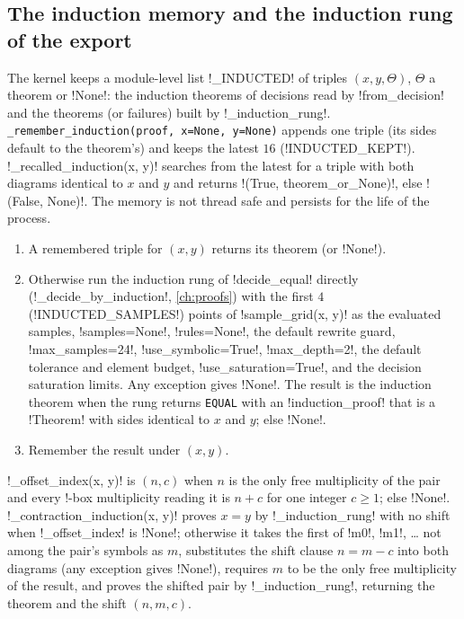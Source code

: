 \subsection{The induction memory and the induction rung of the export}\label{sec:kernel-memory}

The kernel keeps a module-level list \py!_INDUCTED! of triples $(x, y, \Theta)$, $\Theta$ a theorem or \py!None!: the induction theorems of decisions read by \py!from_decision! and the theorems (or failures) built by \py!_induction_rung!. \texttt{\_\allowbreak{}remember\_\allowbreak{}induction(\allowbreak{}proof,\allowbreak{} x=None,\allowbreak{} y=None)} appends one triple (its sides default to the theorem's) and keeps the latest $16$ (\py!INDUCTED_KEPT!). \py!_recalled_induction(x, y)! searches from the latest for a triple with both diagrams identical to $x$ and $y$ and returns \py!(True, theorem_or_None)!, else \py!(False, None)!. The memory is not thread safe and persists for the life of the process.

\begin{algorithm}\label{alg:kernel-induction-rung}
\begin{enumerate}
\item A remembered triple for $(x,y)$ returns its theorem (or \py!None!).
\item Otherwise run the induction rung of \py!decide_equal! directly (\py!_decide_by_induction!, \cref{ch:proofs}) with the first $4$ (\py!INDUCTED_SAMPLES!) points of \py!sample_grid(x, y)! as the evaluated samples, \code!samples=None!, \code!rules=None!, the default rewrite guard, \code!max_samples=24!, \code!use_symbolic=True!, \code!max_depth=2!, the default tolerance and element budget, \code!use_saturation=True!, and the decision saturation limits. Any exception gives \py!None!. The result is the induction theorem when the rung returns \texttt{EQUAL} with an \py!induction_proof! that is a \py!Theorem! with sides identical to $x$ and $y$; else \py!None!.
\item Remember the result under $(x,y)$.
\end{enumerate}
\end{algorithm}

\py!_offset_index(x, y)! is $(n, c)$ when $n$ is the only free multiplicity of the pair and every !-box multiplicity reading it is $n+c$ for one integer $c\ge1$; else \py!None!. \py!_contraction_induction(x, y)! proves $x=y$ by \py!_induction_rung! with no shift when \py!_offset_index! is \py!None!; otherwise it takes the first of \code!m0!, \code!m1!, \ldots{} not among the pair's symbols as $m$, substitutes the shift clause $n = m - c$ into both diagrams (any exception gives \py!None!), requires $m$ to be the only free multiplicity of the result, and proves the shifted pair by \py!_induction_rung!, returning the theorem and the shift $(n, m, c)$.

